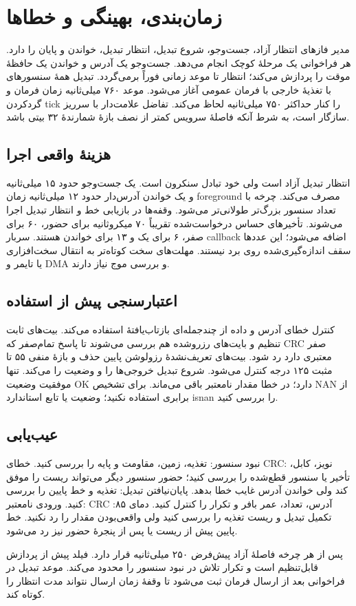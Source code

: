 \section{زمان‌بندی، بهینگی و خطاها}
مدیر فازهای انتظار آزاد، جست‌وجو، شروع تبدیل، انتظار تبدیل، خواندن و پایان
را دارد. هر فراخوانی یک مرحلهٔ کوچک انجام می‌دهد. جست‌وجو یک آدرس و خواندن یک
حافظهٔ موقت را پردازش می‌کند؛ انتظار تا موعد زمانی فوراً برمی‌گردد. تبدیل
همهٔ سنسورهای با تغذیهٔ خارجی با فرمان عمومی آغاز می‌شود. موعد ۷۶۰ میلی‌ثانیه
زمان فرمان و گردکردن tick را کنار حداکثر ۷۵۰ میلی‌ثانیه لحاظ می‌کند. تفاضل
علامت‌دار با سرریز سازگار است، به شرط آنکه فاصلهٔ سرویس کمتر از نصف بازهٔ
شمارندهٔ ۳۲ بیتی باشد.

\subsection{هزینهٔ واقعی اجرا}
انتظار تبدیل آزاد است ولی خود تبادل سنکرون است. یک جست‌وجو حدود ۱۵ میلی‌ثانیه
و یک خواندن آدرس‌دار حدود ۱۲ میلی‌ثانیه زمان foreground مصرف می‌کند. چرخه با
تعداد سنسور بزرگ‌تر طولانی‌تر می‌شود. وقفه‌ها در بازیابی خط و انتظار تبدیل
اجرا می‌شوند. تأخیرهای حساس درخواست‌شده تقریباً ۷۰ میکروثانیه برای حضور،
۶۰ برای صفر، ۶ برای یک و ۱۳ برای خواندن هستند. سربار callback اضافه می‌شود؛
این عددها سقف اندازه‌گیری‌شده روی برد نیستند. مهلت‌های سخت کوتاه‌تر به انتقال
سخت‌افزاری یا تایمر و DMA و بررسی موج نیاز دارند.

\subsection{اعتبارسنجی پیش از استفاده}
کنترل خطای آدرس و داده از چندجمله‌ای بازتاب‌یافتهٔ
استفاده می‌کند. بیت‌های ثابت تنظیم و بایت‌های رزروشده هم بررسی می‌شوند تا پاسخ
تمام‌صفر که CRC صفر معتبری دارد رد شود. بیت‌های تعریف‌نشدهٔ رزولوشن پایین حذف
و بازهٔ منفی ۵۵ تا مثبت ۱۲۵ درجه کنترل می‌شود. شروع تبدیل خروجی‌ها را
و وضعیت را
می‌کند. تنها موفقیت وضعیت OK دارد؛ در خطا مقدار نامعتبر باقی می‌ماند. برای
تشخیص NAN از برابری استفاده نکنید؛ وضعیت یا تابع استاندارد isnan را بررسی کنید.

\subsection{عیب‌یابی}
نبود سنسور: تغذیه، زمین، مقاومت و پایه را بررسی کنید. خطای CRC: نویز، کابل،
تأخیر یا سنسور قطع‌شده را بررسی کنید؛ حضور سنسور دیگر می‌تواند ریست را موفق
کند ولی خواندن آدرس غایب خطا بدهد. پایان‌نیافتن تبدیل: تغذیه و خط پایین را
بررسی کنید. ورودی نامعتبر: CRC آدرس، تعداد، عمر بافر و تکرار را کنترل کنید.
دمای ۸۵: تکمیل تبدیل و ریست تغذیه را بررسی کنید ولی واقعی‌بودن مقدار را رد
نکنید. خط پایین پیش از ریست یا پس از پنجرهٔ حضور نیز رد می‌شود.

پس از هر چرخه فاصلهٔ آزاد پیش‌فرض ۲۵۰ میلی‌ثانیه قرار دارد. فیلد
پیش از پردازش قابل‌تنظیم است و تکرار تلاش در نبود سنسور را محدود می‌کند.
موعد تبدیل در فراخوانی بعد از ارسال فرمان ثبت می‌شود تا وقفهٔ زمان ارسال
نتواند مدت انتظار را کوتاه کند.
